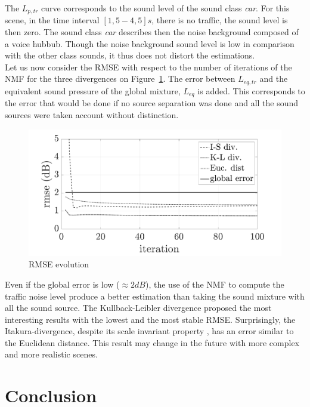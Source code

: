\documentclass{article}
\begin{document}
\begin{sloppy}
The $L_{p,tr}$ curve corresponds to the sound level of the sound class \textit{car}. For this scene, in the time interval $\left[ 1,5 - 4,5\right] s$, there is no traffic, the sound level is then zero. The sound class \textit{car} describes then the noise background composed of a voice hubbub. Though the noise background sound level is low in comparison with the other class sounds, it thus does not distort the estimations.\\

Let us now consider the RMSE with respect to the number of iterations of the NMF for the three divergences on Figure~\ref{fig:rmse}. The error between $L_{eq,tr}$ and the equivalent sound pressure of the global mixture, $L_{eq}$ is added. This corresponds to the error that would be done if no source separation was done and all the sound sources were taken account without distinction.

\begin{figure}[t]
\centering
\includegraphics[scale=0.30]{images/comparaison_RMSE_nbCl3.pdf}
\caption{RMSE evolution}
\label{fig:rmse}
\end{figure}

Even if the global error is low ($\approx 2 dB$), the use of the NMF to compute the traffic noise level produce a better estimation than taking the sound mixture with all the sound source. The Kullback-Leibler divergence proposed the most interesting results with the lowest and the most stable RMSE. 
Surprisingly, the Itakura-divergence, despite its scale invariant property \cite{fevotte2011}, has an error similar to the Euclidean distance. This result may change in the future with more complex and more realistic scenes.


\section{Conclusion}


\end{sloppy}
\end{document}
